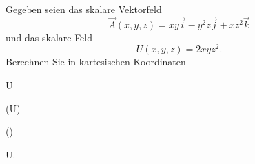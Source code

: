 \begin{atiTask}[
  title = Gradient und Rotation
]

Gegeben seien das skalare Vektorfeld
\[
\vec{A}(x,y,z)=xy\vec{i}-y^2z\vec{j}+xz^2\vec{k}
\]
und das skalare Feld
\[
U(x,y,z)=2xyz^2.
\]
Berechnen Sie in kartesischen Koordinaten
\begin{multicols}{2}
\begin{atiSubequations}
\item{\gradient U}
\item{\curl {}}
\item{\curl (U)}
\item{\curl \curl{}}
\item{\gradient(\cdot \curl{})}
\item{\curl\gradient U.}
\end{atiSubequations}
\end{multicols}

\end{atiTask}

\begin{atiSolution}

\end{atiSolution}